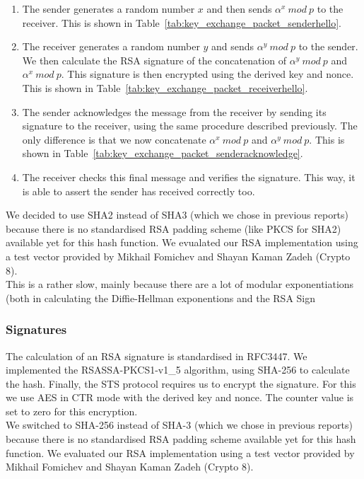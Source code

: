 \documentclass[a4paper]{article}
\begin{document}
\begin{enumerate}
    \item The sender generates a random number $x$ and then sends $\alpha^x\ mod\ p$ to the receiver. This is shown in Table~\ref{tab:key_exchange_packet_senderhello}.
    \item The receiver generates a random number $y$ and sends $\alpha^y\ mod\ p$ to the sender. We then calculate the RSA signature of the concatenation of $\alpha^y\ mod\ p$ and $\alpha^x\ mod\ p$. This signature is then encrypted using the derived key and nonce. This is shown in Table~\ref{tab:key_exchange_packet_receiverhello}.
    \item The sender acknowledges the message from the receiver by sending its signature to the receiver, using the same procedure described previously. The only difference is that we now concatenate $\alpha^x\ mod\ p$ and $\alpha^y\ mod\ p$. This is shown in Table~\ref{tab:key_exchange_packet_senderacknowledge}.
    \item The receiver checks this final message and verifies the signature. This way, it is able to assert the sender has received correctly too.
\end{enumerate}

We decided to use SHA2 instead of SHA3 (which we chose in previous reports) because there is no standardised RSA padding scheme (like PKCS for SHA2) available yet for this hash function. We evualated our RSA implementation using a test vector provided by Mikhail Fomichev and Shayan Kaman Zadeh (Crypto 8).\\

This is a rather slow, mainly because there are a lot of modular exponentiations (both in calculating the Diffie-Hellman exponentions and the RSA Sign

\subsubsection{Signatures}

The calculation of an RSA signature is standardised in RFC3447. We implemented the RSASSA-PKCS1-v1\_5 algorithm, using SHA-256 to calculate the hash. Finally, the STS protocol requires us to encrypt the signature. For this we use AES in CTR mode with the derived key and nonce. The counter value is set to zero for this encryption.\\

We switched to SHA-256 instead of SHA-3 (which we chose in previous reports) because there is no standardised RSA padding scheme available yet for this hash function. We evaluated our RSA implementation using a test vector provided by Mikhail Fomichev and Shayan Kaman Zadeh (Crypto 8).
\end{document}
